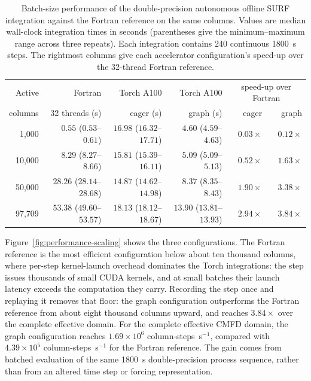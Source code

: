 \begin{table}[t]
\caption{Batch-size performance of the double-precision autonomous offline
SURF integration against the Fortran reference on the same columns. Values
are median wall-clock integration times in seconds (parentheses give the
minimum--maximum range across three repeats). Each integration contains 240
continuous 1800~s steps. The rightmost columns give each accelerator
configuration's speed-up over the 32-thread Fortran reference.}
\label{tab:performance-scaling}
\centering
\small
\begin{tabular}{rrrrrr}
\hline
Active & Fortran & Torch A100 & Torch A100 & \multicolumn{2}{c}{speed-up over Fortran} \\
columns & 32 threads (s) & eager (s) & graph (s) & eager & graph \\
\hline
1,000 & $0.55$ ($0.53$--$0.61$) & $16.98$ ($16.32$--$17.71$) & $4.60$ ($4.59$--$4.63$) & $0.03\times$ & $0.12\times$ \\
10,000 & $8.29$ ($8.27$--$8.66$) & $15.81$ ($15.39$--$16.11$) & $5.09$ ($5.09$--$5.13$) & $0.52\times$ & $1.63\times$ \\
50,000 & $28.26$ ($28.14$--$28.68$) & $14.87$ ($14.62$--$14.98$) & $8.37$ ($8.35$--$8.43$) & $1.90\times$ & $3.38\times$ \\
97,709 & $53.38$ ($49.60$--$53.57$) & $18.13$ ($18.12$--$18.67$) & $13.90$ ($13.81$--$13.93$) & $2.94\times$ & $3.84\times$ \\
\hline
\end{tabular}
\end{table}

Figure~\ref{fig:performance-scaling} shows the three configurations. The
Fortran reference is the most efficient configuration below about ten
thousand columns, where per-step kernel-launch overhead dominates the Torch
integrations: the step issues thousands of small CUDA kernels, and at small
batches their launch latency exceeds the computation they carry. Recording
the step once and replaying it removes that floor: the graph configuration
outperforms the Fortran reference from about eight thousand columns upward,
and reaches $3.84\times$ over the complete effective domain. For the complete
effective CMFD domain, the graph configuration reaches
$1.69\times10^{6}$ column-steps~s$^{-1}$, compared with
$4.39\times10^{5}$ column-steps~s$^{-1}$ for the Fortran reference. The gain
comes from batched evaluation of the same 1800~s double-precision process
sequence, rather than from an altered time step or forcing representation.

